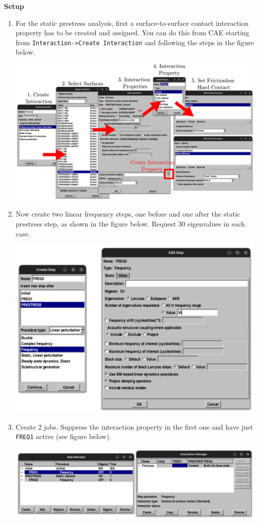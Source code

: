 \documentclass[11pt]{article}
\begin{document}
\textbf{Setup}
\begin{enumerate}
\item For the static prestress analysis, first a surface-to-surface contact interaction property has to be created and assigned.
You can do this from CAE starting from \texttt{Interaction->Create Interaction} and following the steps in the figure below.
\begin{center}
\includegraphics[width=.9\linewidth]{./figs/setcontact.png}
\end{center}
\item Now create two linear frequency steps, one before and one after the static prestress step, as shown in the figure below.
Request 30 eigenvalues in each case.
\begin{center}
\includegraphics[width=.9\linewidth]{./figs/lfreq.png}
\end{center}
\item Create 2 jobs. Suppress the interaction property in the first one and have just \texttt{FREQ1} active (see figure below).
\begin{center}
\includegraphics[width=.9\linewidth]{./figs/run1.png}

\end{center}
\end{enumerate}
\end{document}
